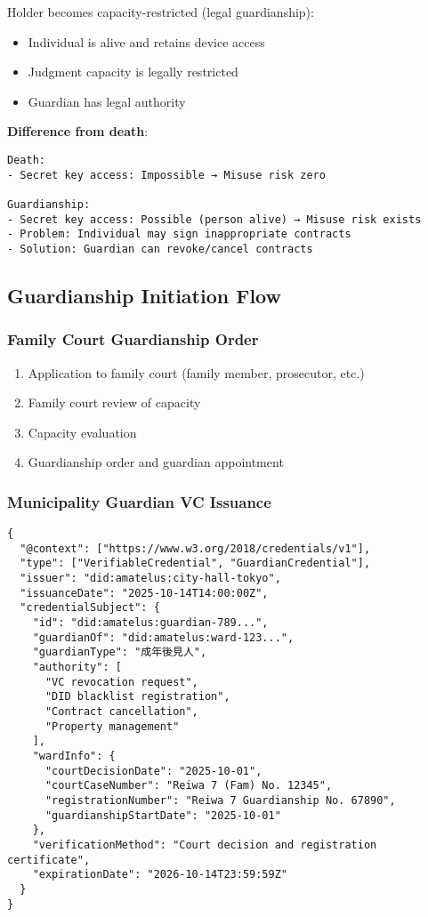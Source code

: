 Holder becomes capacity-restricted (legal guardianship):
\begin{itemize}
  \item Individual is alive and retains device access
  \item Judgment capacity is legally restricted
  \item Guardian has legal authority
\end{itemize}

\textbf{Difference from death}:

\begin{verbatim}
Death:
- Secret key access: Impossible → Misuse risk zero

Guardianship:
- Secret key access: Possible (person alive) → Misuse risk exists
- Problem: Individual may sign inappropriate contracts
- Solution: Guardian can revoke/cancel contracts
\end{verbatim}

\subsection{Guardianship Initiation Flow}

\subsubsection{Family Court Guardianship Order}

\begin{enumerate}
  \item Application to family court (family member, prosecutor, etc.)
  \item Family court review of capacity
  \item Capacity evaluation
  \item Guardianship order and guardian appointment
\end{enumerate}

\subsubsection{Municipality Guardian VC Issuance}

\begin{verbatim}
{
  "@context": ["https://www.w3.org/2018/credentials/v1"],
  "type": ["VerifiableCredential", "GuardianCredential"],
  "issuer": "did:amatelus:city-hall-tokyo",
  "issuanceDate": "2025-10-14T14:00:00Z",
  "credentialSubject": {
    "id": "did:amatelus:guardian-789...",
    "guardianOf": "did:amatelus:ward-123...",
    "guardianType": "成年後見人",
    "authority": [
      "VC revocation request",
      "DID blacklist registration",
      "Contract cancellation",
      "Property management"
    ],
    "wardInfo": {
      "courtDecisionDate": "2025-10-01",
      "courtCaseNumber": "Reiwa 7 (Fam) No. 12345",
      "registrationNumber": "Reiwa 7 Guardianship No. 67890",
      "guardianshipStartDate": "2025-10-01"
    },
    "verificationMethod": "Court decision and registration certificate",
    "expirationDate": "2026-10-14T23:59:59Z"
  }
}
\end{verbatim}

